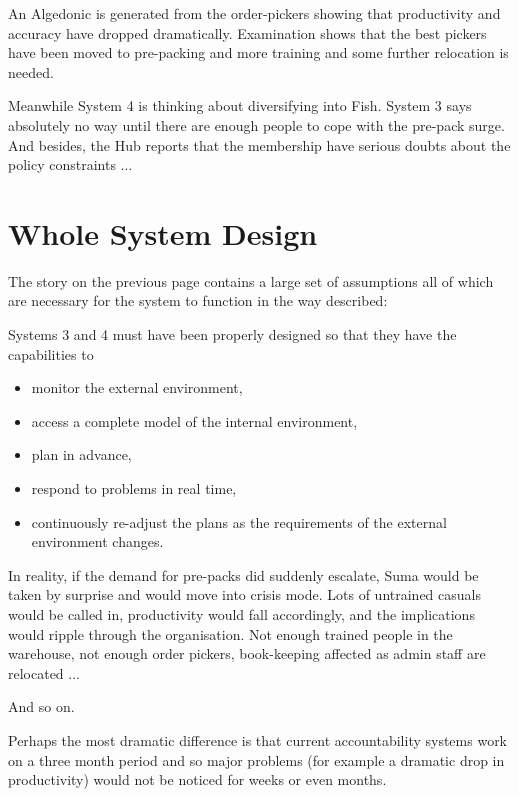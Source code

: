 An Algedonic is generated from the order-pickers showing that productivity and accuracy have dropped dramatically. Examination shows that the best pickers have been moved to pre-packing and more training and some further relocation is needed.

Meanwhile System 4 is thinking about diversifying into Fish. System 3 says absolutely no way until there are enough people to cope with the pre-pack surge. And besides, the Hub reports that the membership have serious doubts about the policy constraints ...

\section*{Whole System Design}
The story on the previous page contains a large set of assumptions all of which are necessary for the system to function in the way described:

Systems 3 and 4 must have been properly designed so that they have the capabilities to

\begin{itemize}
  \item monitor the external environment,

  \item access a complete model of the internal environment,

  \item plan in advance,

  \item respond to problems in real time,

  \item continuously re-adjust the plans as the requirements of the external environment changes.

\end{itemize}

In reality, if the demand for pre-packs did suddenly escalate, Suma would be taken by surprise and would move into crisis mode. Lots of untrained casuals would be called in, productivity would fall accordingly, and the implications would ripple through the organisation. Not enough trained people in the warehouse, not enough order pickers, book-keeping affected as admin staff are relocated ...

And so on.

Perhaps the most dramatic difference is that current accountability systems work on a three month period and so major problems (for example a dramatic drop in productivity) would not be noticed for weeks or even months.

